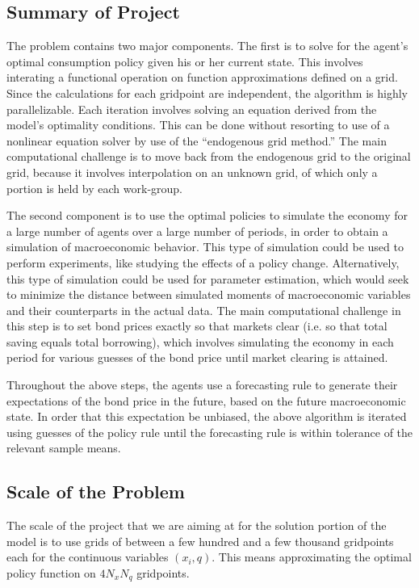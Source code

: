 \documentclass[a4paper,12pt]{article}
\numberwithin{equation}{section}
\theoremstyle{definition}
\begin{document}
\subsection{Summary of Project}

The problem contains two major components. The first is to solve for the
agent's optimal consumption policy given his or her current
state. This involves interating a functional operation on function
approximations defined on a grid. Since the calculations for each
gridpoint are independent, the algorithm is highly
parallelizable. Each iteration involves solving an equation derived
from the model's optimality conditions. This can be done without
resorting to use of a nonlinear equation solver by use of the
``endogenous grid method.'' The main computational challenge is to
move back from the endogenous grid to the original grid, because it
involves interpolation on an unknown grid, of which only a portion is
held by each work-group.

The second component is to use the optimal policies to simulate the
economy for a large number of agents over a large number of periods,
in order to obtain a simulation of macroeconomic behavior. This type
of simulation could be used to perform experiments, like studying the
effects of a policy change. Alternatively, this type of simulation
could be used for parameter estimation, which would seek to minimize
the distance between simulated moments of macroeconomic variables and
their counterparts in the actual data. The main computational
challenge in this step is to set bond prices exactly so that markets
clear (i.e. so that total saving equals total borrowing), which
involves simulating the economy in each period for various guesses of
the bond price until market clearing is attained.

Throughout the above steps, the agents use a forecasting rule to
generate their expectations of the bond price in the future, based on
the future macroeconomic state. In order that this expectation be
unbiased, the above algorithm is iterated using guesses of the policy
rule until the forecasting rule is within tolerance of the relevant
sample means.

\subsection{Scale of the Problem}

The scale of the project that we are aiming at for the solution
portion of the model is to use grids of between a few hundred and a
few thousand gridpoints each for the continuous variables $(x_i,
q)$. This means approximating the optimal policy function on $4 N_x
N_q$ gridpoints.
\end{document}
